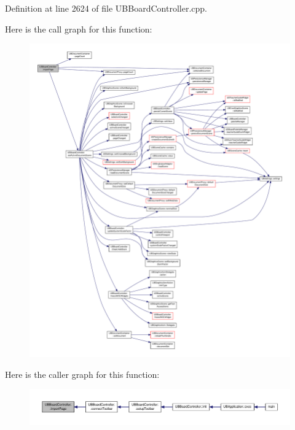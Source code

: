 Definition at line 2624 of file U\-B\-Board\-Controller.\-cpp.



Here is the call graph for this function\-:
\nopagebreak
\begin{figure}[H]
\begin{center}
\leavevmode
\includegraphics[width=350pt]{d7/d62/class_u_b_board_controller_a3c02908763bd2bb49d7006cbf2f1cff8_cgraph}
\end{center}
\end{figure}




Here is the caller graph for this function\-:
\nopagebreak
\begin{figure}[H]
\begin{center}
\leavevmode
\includegraphics[width=350pt]{d7/d62/class_u_b_board_controller_a3c02908763bd2bb49d7006cbf2f1cff8_icgraph}
\end{center}
\end{figure}


